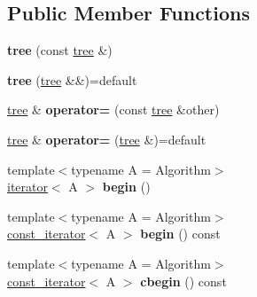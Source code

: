 \subsection*{Public Member Functions}
\begin{DoxyCompactItemize}
\item 
{\bfseries tree} (const \hyperlink{classds_1_1tree}{tree} \&)\hypertarget{classds_1_1tree_a5fec9b3e30c9136d40b74d853e60cae3}{}\label{classds_1_1tree_a5fec9b3e30c9136d40b74d853e60cae3}

\item 
{\bfseries tree} (\hyperlink{classds_1_1tree}{tree} \&\&)=default\hypertarget{classds_1_1tree_a95fec3a97689f87f56eda6deac1ccc56}{}\label{classds_1_1tree_a95fec3a97689f87f56eda6deac1ccc56}

\item 
\hyperlink{classds_1_1tree}{tree} \& {\bfseries operator=} (const \hyperlink{classds_1_1tree}{tree} \&other)\hypertarget{classds_1_1tree_af3e064e789107b89c88f9d216c7c194d}{}\label{classds_1_1tree_af3e064e789107b89c88f9d216c7c194d}

\item 
\hyperlink{classds_1_1tree}{tree} \& {\bfseries operator=} (\hyperlink{classds_1_1tree}{tree} \&)=default\hypertarget{classds_1_1tree_a20baf234b81a44e8e4be0cba7358dcdd}{}\label{classds_1_1tree_a20baf234b81a44e8e4be0cba7358dcdd}

\item 
{\footnotesize template$<$typename A  = Algorithm$>$ }\\\hyperlink{classds_1_1tree__iterator}{iterator}$<$ A $>$ {\bfseries begin} ()\hypertarget{classds_1_1tree_a9883be1f020fe00d7fce890af0757e95}{}\label{classds_1_1tree_a9883be1f020fe00d7fce890af0757e95}

\item 
{\footnotesize template$<$typename A  = Algorithm$>$ }\\\hyperlink{classds_1_1tree__iterator}{const\+\_\+iterator}$<$ A $>$ {\bfseries begin} () const \hypertarget{classds_1_1tree_a08228aecae75f12afda8f46895fe7b11}{}\label{classds_1_1tree_a08228aecae75f12afda8f46895fe7b11}

\item 
{\footnotesize template$<$typename A  = Algorithm$>$ }\\\hyperlink{classds_1_1tree__iterator}{const\+\_\+iterator}$<$ A $>$ {\bfseries cbegin} () const \hypertarget{classds_1_1tree_a0bc328035887fecd0923fbb284ac1420}{}\label{classds_1_1tree_a0bc328035887fecd0923fbb284ac1420}


\end{DoxyCompactItemize}
